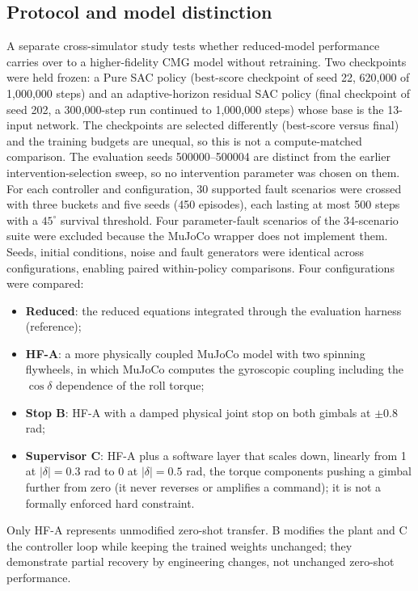 \documentclass[preprint,12pt,authoryear=false]{elsarticle}
\theoremstyle{remark}\newtheorem{remark}{Remark}
\theoremstyle{plain}\newtheorem{proposition}{Proposition}\newtheorem{lemma}{Lemma}
\theoremstyle{definition}\newtheorem{assumption}{Assumption}
\begin{document}
\subsection{Protocol and model distinction}
A separate cross-simulator study tests whether reduced-model performance carries over to a higher-fidelity CMG model without retraining. Two checkpoints were held frozen: a Pure SAC policy (best-score checkpoint of seed 22, 620{,}000 of 1{,}000{,}000 steps) and an adaptive-horizon residual SAC policy (final checkpoint of seed 202, a 300{,}000-step run continued to 1{,}000{,}000 steps) whose base is the 13-input network. The checkpoints are selected differently (best-score versus final) and the training budgets are unequal, so this is not a compute-matched comparison. The evaluation seeds 500000--500004 are distinct from the earlier intervention-selection sweep, so no intervention parameter was chosen on them. For each controller and configuration, 30 supported fault scenarios were crossed with three buckets and five seeds (450 episodes), each lasting at most 500 steps with a $45^\circ$ survival threshold. Four parameter-fault scenarios of the 34-scenario suite were excluded because the MuJoCo wrapper does not implement them. Seeds, initial conditions, noise and fault generators were identical across configurations, enabling paired within-policy comparisons. Four configurations were compared:
\begin{itemize}
\item \textbf{Reduced}: the reduced equations integrated through the evaluation harness (reference);
\item \textbf{HF-A}: a more physically coupled MuJoCo model with two spinning flywheels, in which MuJoCo computes the gyroscopic coupling including the $\cos\delta$ dependence of the roll torque;
\item \textbf{Stop B}: HF-A with a damped physical joint stop on both gimbals at $\pm0.8$ rad;
\item \textbf{Supervisor C}: HF-A plus a software layer that scales down, linearly from 1 at $|\delta|=0.3$ rad to 0 at $|\delta|=0.5$ rad, the torque components pushing a gimbal further from zero (it never reverses or amplifies a command); it is not a formally enforced hard constraint.
\end{itemize}
Only HF-A represents unmodified zero-shot transfer. B modifies the plant and C the controller loop while keeping the trained weights unchanged; they demonstrate partial recovery by engineering changes, not unchanged zero-shot performance.
\end{document}
